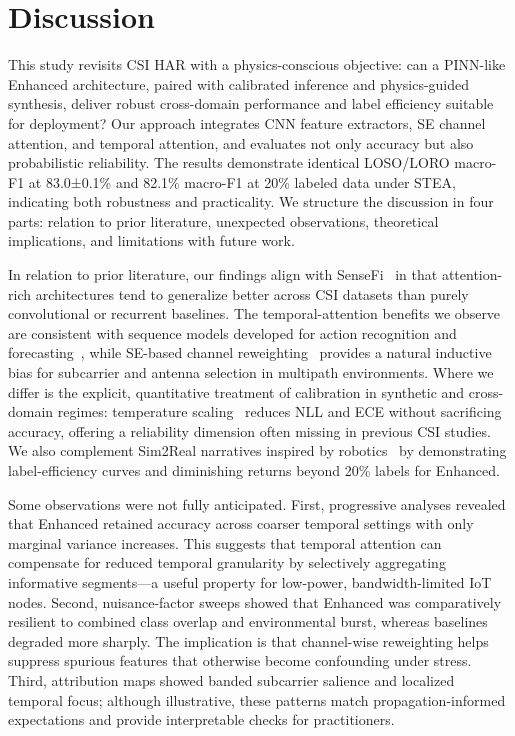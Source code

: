 \documentclass[journal]{IEEEtran}
\begin{document}
\section{Discussion}
This study revisits CSI HAR with a physics-conscious objective: can a PINN-like Enhanced architecture, paired with calibrated inference and physics-guided synthesis, deliver robust cross-domain performance and label efficiency suitable for deployment? Our approach integrates CNN feature extractors, SE channel attention, and temporal attention, and evaluates not only accuracy but also probabilistic reliability. The results demonstrate identical LOSO/LORO macro-F1 at 83.0±0.1\% and 82.1\% macro-F1 at 20\% labeled data under STEA, indicating both robustness and practicality. We structure the discussion in four parts: relation to prior literature, unexpected observations, theoretical implications, and limitations with future work.

In relation to prior literature, our findings align with SenseFi~\cite{yang2023sensefi} in that attention-rich architectures tend to generalize better across CSI datasets than purely convolutional or recurrent baselines. The temporal-attention benefits we observe are consistent with sequence models developed for action recognition and forecasting~\cite{li2020tea,bertasius2021timesformer,lim2021tft,zhou2021informer}, while SE-based channel reweighting~\cite{se_networks2018} provides a natural inductive bias for subcarrier and antenna selection in multipath environments. Where we differ is the explicit, quantitative treatment of calibration in synthetic and cross-domain regimes: temperature scaling~\cite{calibration_guo2017} reduces NLL and ECE without sacrificing accuracy, offering a reliability dimension often missing in previous CSI studies. We also complement Sim2Real narratives inspired by robotics~\cite{peng2018sim2real} by demonstrating label-efficiency curves and diminishing returns beyond 20\% labels for Enhanced.

Some observations were not fully anticipated. First, progressive analyses revealed that Enhanced retained accuracy across coarser temporal settings with only marginal variance increases. This suggests that temporal attention can compensate for reduced temporal granularity by selectively aggregating informative segments—a useful property for low-power, bandwidth-limited IoT nodes. Second, nuisance-factor sweeps showed that Enhanced was comparatively resilient to combined class overlap and environmental burst, whereas baselines degraded more sharply. The implication is that channel-wise reweighting helps suppress spurious features that otherwise become confounding under stress. Third, attribution maps showed banded subcarrier salience and localized temporal focus; although illustrative, these patterns match propagation-informed expectations and provide interpretable checks for practitioners.
\end{document}
